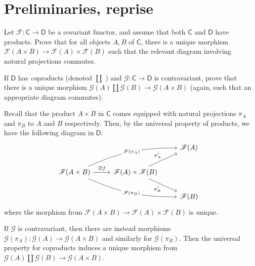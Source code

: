 \documentclass[../../master.tex]{subfiles}
\begin{document}
\section{Preliminaries, reprise}

\begin{problem}
    Let $\mathscr{F} : \mathsf{C} \to \mathsf{D}$ be a covariant functor, and assume that both $\mathsf{C}$ and $\mathsf{D}$ have products.
    Prove that for all objects $A, B$ of $\mathsf{C}$, there is a unique morphism $\mathscr{F}(A \times B) \to \mathscr{F}(A) \times \mathscr{F}(B)$ such that the relevant diagram involving natural projections commutes.

    If $\mathsf{D}$ has \textit{co}products (denoted $\coprod$ ) and $\mathscr{G} : \mathsf{C} \to \mathsf{D}$ is contravariant, prove that there is a unique morphism $\mathscr{G}(A) \coprod \mathscr{G}(B) \to \mathscr{G}(A \times B)$ (again, such that an appropriate diagram commutes).
\end{problem}

\begin{solution}
    Recall that the product $A \times B$ in $\mathsf{C}$ comes equipped with natural projections $\pi_A$ and $\pi_B$ to $A$ and $B$ respectively.
    Then, by the universal property of products, we have the following diagram in $\mathsf{D}$.
    \[
    \begin{tikzcd}
    && {\mathscr{F}(A)} \\
        {\mathscr{F}(A \times B)} & {\mathscr{F}(A) \times \mathscr{F}(B)} \\
            && {\mathscr{F}(B)}
                \arrow["{\pi'_A}", from=2-2, to=1-3]
                    \arrow["{\pi'_B}"', from=2-2, to=3-3]
                        \arrow["{\mathscr{F}(\pi_A)}"{description}, bend left=12, from=2-1, to=1-3]
                            \arrow["{\mathscr{F}(\pi_B)}"{description}, bend right=12, from=2-1, to=3-3]
                                \arrow["{\exists!f}", from=2-1, to=2-2]
    \end{tikzcd}
    \]
    where the morphism from $\mathscr{F}(A \times B) \to \mathscr{F}(A) \times \mathscr{F}(B)$ is unique.

    If $\mathscr{G}$ is contravariant, then there are instead morphisms $\mathscr{G}(\pi_A) : \mathscr{G}(A) \to \mathscr{G}(A \times B)$ and similarly for  $\mathscr{G}(\pi_B)$.
    Then the universal property for coproducts induces a unique morphism from $\mathscr{G}(A) \coprod \mathscr{G}(B) \to \mathscr{G}(A \times B)$.
\end{solution}
\end{document}
